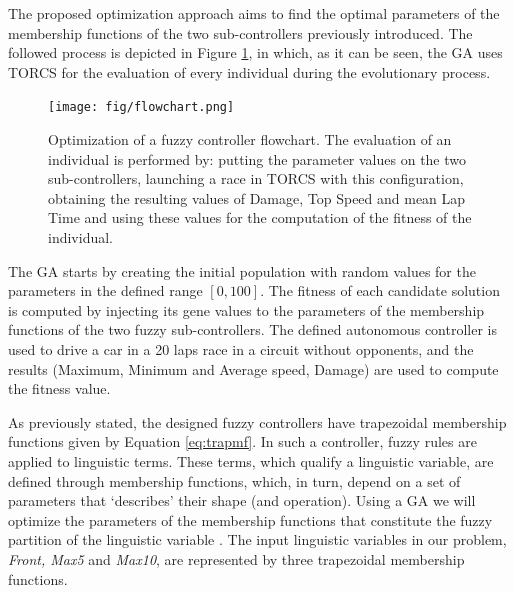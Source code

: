 \documentclass[conference]{IEEEtran}
\begin{document}

The proposed optimization approach aims to find the optimal parameters of the membership functions of the two sub-controllers previously introduced. 
The followed process is depicted in Figure \ref{fig:ga}, in which, as it can be seen, the GA uses TORCS for the evaluation of every individual during the evolutionary process.

\begin{figure}[!ht]
  \label{fig:ga}
  \begin{center}
    \texttt{[image: fig/flowchart.png]}
  \end{center}
  \caption{Optimization of a fuzzy controller flowchart. The evaluation of an individual is performed by: putting the parameter values on the two sub-controllers, launching a race in TORCS with this configuration, obtaining the resulting values of Damage, Top Speed and mean Lap Time and using these values for the computation of the fitness of the individual.}
\end{figure}
	
The GA starts by creating the initial population with random values
for the parameters in the defined range $[0,100]$. The fitness of each
candidate solution is computed by injecting its gene values to the
parameters of the membership functions of the two fuzzy
sub-controllers. The defined autonomous controller is used to drive a
car in a 20 laps race in a circuit without opponents, and the
results (Maximum, Minimum and Average speed, Damage) are used to compute the fitness value. 


As previously stated, the designed fuzzy controllers have trapezoidal membership functions given by Equation \ref{eq:trapmf}.
In such a controller, fuzzy rules are applied to linguistic
terms. These terms, which qualify a linguistic variable, are defined
through membership functions, which, in turn, depend on a set of
parameters that `describes' their shape (and operation). Using a GA we
will optimize the parameters of the membership functions that
constitute the fuzzy partition of the linguistic variable
\cite{ThangG08}. The input linguistic variables in our problem,
\textit{Front, Max5} and \textit{Max10}, are represented by three
trapezoidal membership functions. 
\end{document}
